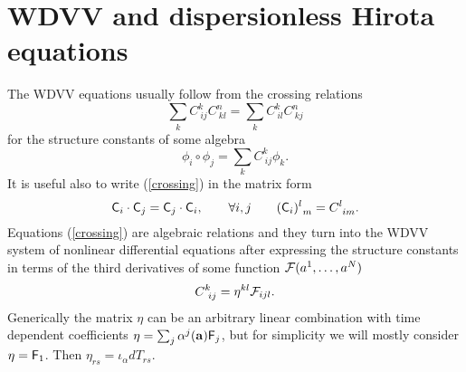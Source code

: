 \documentclass[a4paper,]{article}
\def\F{{\cal F}}
\def\f{{\sf F}}
\def\C{{\sf C}}
\begin{document}
\section{WDVV and dispersionless Hirota equations}


The WDVV equations usually follow from the crossing relations
\begin{equation}
\label{crossing}
\sum_k C^k_{\ ij}C^n_{\ kl} = \sum_k C^k_{\ il}C^n_{\ kj}
\end{equation}
for the structure constants of some algebra
\begin{equation}
\label{alg}
\phi_i\circ\phi_j =\sum_k  C^k_{\ ij}\phi_k.
\end{equation}
It is useful also to write (\ref{crossing}) in the matrix form
\begin{equation}
\label{crossmatr}
\C_i\cdot \C_j = \C_j\cdot \C_i,\qquad \forall i,j
\qquad  (\C_i)\sp{l}_{\ m} = C_{\ im}\sp{l}.
\end{equation}
Equations (\ref{crossing}) are algebraic relations and they turn into the
WDVV system of nonlinear differential equations after expressing
the structure constants in terms of the third derivatives of some
function $\F (a\sp1,\dots,a\sp{N})$
\begin{equation}
\label{cf}
C_{\ ij}^k = \eta^{kl}\F_{ijl}.
\end{equation}
Generically the matrix $\eta$ can be an arbitrary linear
combination with time dependent coefficients 
$\eta = \sum_j \alpha\sp{j}({\bf a})\f_j$,
but for simplicity we will mostly consider $\eta=\f_1$.
Then $\eta_{rs}=\iota_\alpha dT_{rs}$.
\end{document}
